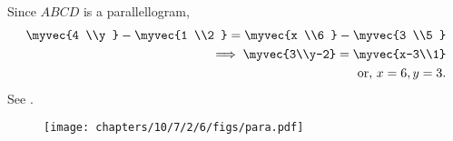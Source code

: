 Since $ABCD$ is a parallellogram,
\begin{align}
  \label{eq:chapters/10/7/2/6/tables/det2f}
 \myvec{4 \\y } - \myvec{1 \\2 }  
= \myvec{x \\6 } - \myvec{3 \\5 }  
\\
\implies	\myvec{3\\y-2}=\myvec{x-3\\1}\\
	\text{ or, }x=6 ,y=3.
\end{align}
See  .
\begin{figure}[H]
	\begin{center}
  \texttt{[image: chapters/10/7/2/6/figs/para.pdf]}
	\end{center}
\caption{}
\label{fig:chapters/10/7/2/6/Fig3}
\end{figure}

